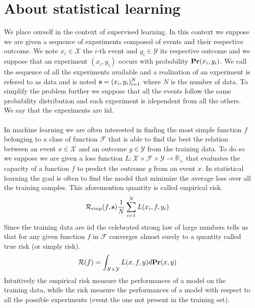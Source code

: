 
\section{About statistical learning}
\label{sec:about_statistical_learning}
We place ourself in the context of supervised learning. In this context we
suppose we are given a sequence of experiments composed of events and their
respective outcome. We note $x_i\in\mathcal{X}$ the $i$-th event and
$y_i\in\mathcal{Y}$ its respective outcome and we suppose that an experiment
$(x_i, y_i)$ occurs with probability ${\mathbf{{Pr}}}(x_i, y_i)$. We call the
sequence of all the experiments available  and a realization
of an experiment is refered to as data and is noted $\boldsymbol{\mathbf{s}}=(x_i,
y_i)_{i=1}^N$ where $N$ is the number of data. To simplify the problem further
we suppose that all the events follow the same probability distribution and
each experiment is idependent from all the others. We say that the experiments
are \acf{iid}.
\paragraph{}
In machine learning we are often interested in finding the most simple function
$f$ belonging to a class of function $\mathcal{F}$ that is able to find the
best the relation between an event $x\in\mathcal{X}$ and an outcome
$y\in\mathcal{Y}$ from the training data. To do so we suppose we are given a
loss function $L:\mathcal{X}\times\mathcal{F}\times\mathcal{Y} \to
\mathbb{R}_+$ that evaluates the capacity of a function $f$ to predict the
outcome $y$ from an event $x$. 
In statistical learning the goal is often to find the model that minimize the
average loss over all the training samples. This aforemention quantity is
called empirical risk.
\begin{dmath*}
    \mathcal{R}_{emp}(f, \seq{s}) \frac{1}{N}\sum_{i=1}^N L(x_i, f, y_i)
\end{dmath*}
Since the training data are \acs{iid} the celebrated strong law of large
numbers tells us that for any given function $f$ in $\mathcal{F}$ converges
almost surely to a quantity called true risk (or simply risk).
\begin{dmath*}
    \mathcal{R}(f) = \int_{\mathcal{X}\times\mathcal{Y}} L(x, f, y)
    d\probability(x, y)
\end{dmath*}
Intuitively the empirical risk measure the performances of a model on the
training data, while the risk measure the performances of a model with respect
to all the possible experiments (event the one not present in the training
set). 
